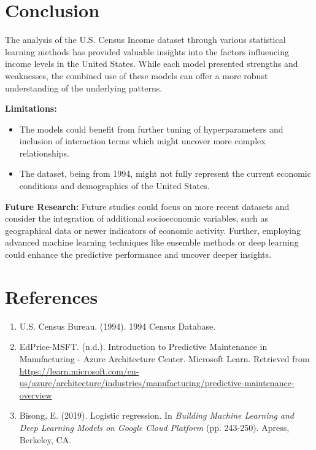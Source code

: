\documentclass[12pt]{article}
\begin{document}
\section{Conclusion}
The analysis of the U.S. Census Income dataset through various statistical learning methods has provided valuable insights into the factors influencing income levels in the United States. While each model presented strengths and weaknesses, the combined use of these models can offer a more robust understanding of the underlying patterns.

\textbf{Limitations:}
\begin{itemize}
    \item The models could benefit from further tuning of hyperparameters and inclusion of interaction terms which might uncover more complex relationships.
    \item The dataset, being from 1994, might not fully represent the current economic conditions and demographics of the United States.
\end{itemize}

\textbf{Future Research:}
Future studies could focus on more recent datasets and consider the integration of additional socioeconomic variables, such as geographical data or newer indicators of economic activity. Further, employing advanced machine learning techniques like ensemble methods or deep learning could enhance the predictive performance and uncover deeper insights.

\section{References}
\begin{enumerate}
    \item U.S. Census Bureau. (1994). 1994 Census Database.
    \item EdPrice-MSFT. (n.d.). Introduction to Predictive Maintenance in Manufacturing - Azure Architecture Center. Microsoft Learn. Retrieved from \url{https://learn.microsoft.com/en-us/azure/architecture/industries/manufacturing/predictive-maintenance-overview}
    \item Bisong, E. (2019). Logistic regression. In \textit{Building Machine Learning and Deep Learning Models on Google Cloud Platform} (pp. 243-250). Apress, Berkeley, CA.
\end{enumerate}
\end{document}
